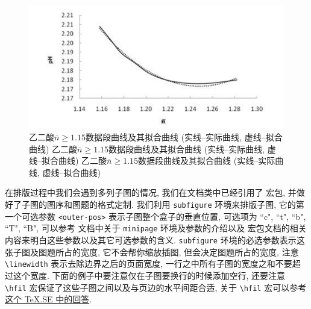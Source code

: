 \begin{figure}[htb]
  \centering
  \includegraphics{figures/oxalic-acid-n-geq-1.15.pdf}
  \caption{乙二酸$\overline{n}\geq 1.15$数据段曲线及其拟合曲线 (实线--实际曲线, 虚线--拟合曲线) 乙二酸$\overline{n}\geq 1.15$数据段曲线及其拟合曲线 (实线--实际曲线, 虚线--拟合曲线) 乙二酸$\overline{n}\geq 1.15$数据段曲线及其拟合曲线 (实线--实际曲线, 虚线--拟合曲线)}
\end{figure}

在排版过程中我们会遇到多列子图的情况, 我们在文档类中已经引用了  宏包, 并做好了子图的图序和图题的格式定制. 我们利用 \verb|subfigure| 环境来排版子图, 它的第一个可选参数 \verb|<outer-pos>| 表示子图整个盒子的垂直位置, 可选项为 ``c", ``t", ``b", ``T", ``B", 可以参考  文档中关于 \verb|minipage| 环境及参数的介绍以及  宏包文档的相关内容来明白这些参数以及其它可选参数的含义. \verb|subfigure| 环境的必选参数表示这张子图及图题所占的宽度, 它不会帮你缩放插图, 但会决定图题所占的宽度, 注意\verb|\linewidth| 表示去除边界之后的页面宽度, 一行之中所有子图的宽度之和不要超过这个宽度. 下面的例子中要注意仅在子图要换行的时候添加空行, 还要注意 \verb|\hfil| 宏保证了这些子图之间以及与页边的水平间距合适, 关于 \verb|\hfil| 宏可以参考\href{https://tex.stackexchange.com/a/528921/184559}{这个 TeX.SE 中的回答}.

